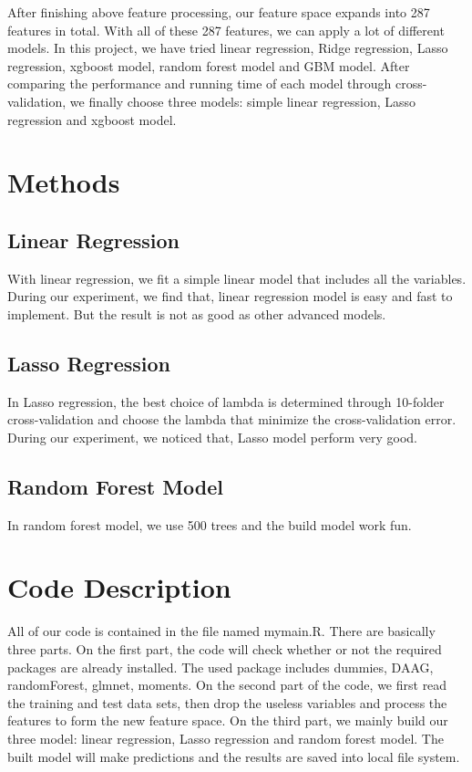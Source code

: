\documentclass[12pt]{article}
\begin{document}
After finishing above feature processing, our feature space expands into 287 features in total. With all of these 287 features, we can apply a lot of different models. In this project, we have tried linear regression, Ridge regression, Lasso regression, xgboost model, random forest model and GBM model. After comparing the performance and running time of each model through cross-validation, we finally choose three models: simple linear regression, Lasso regression and xgboost model.

\section{Methods}

\subsection{Linear Regression}
With linear regression, we fit a simple linear model that includes all the variables. During our experiment, we find that, linear regression model is easy and fast to implement. But the result is not as good as other advanced models.

\subsection{Lasso Regression}
In Lasso regression, the best choice of lambda is determined through 10-folder cross-validation and choose the lambda that minimize the cross-validation error. During our experiment, we noticed that, Lasso model perform very good.

\subsection{Random Forest Model}
In random forest model, we use 500 trees and the build model work fun.


\section{Code Description}
All of our code is contained in the file named mymain.R. There are basically three parts. On the first part, the code will check whether or not the required packages are already installed. The used package includes dummies, DAAG, randomForest, glmnet, moments. On the second part of the code, we first read the training and test data sets, then drop the useless variables and process the features to form the new feature space. On the third part, we mainly build our three model: linear regression, Lasso regression and random forest model. The built model will make predictions and the results are saved into local file system.
\end{document}
